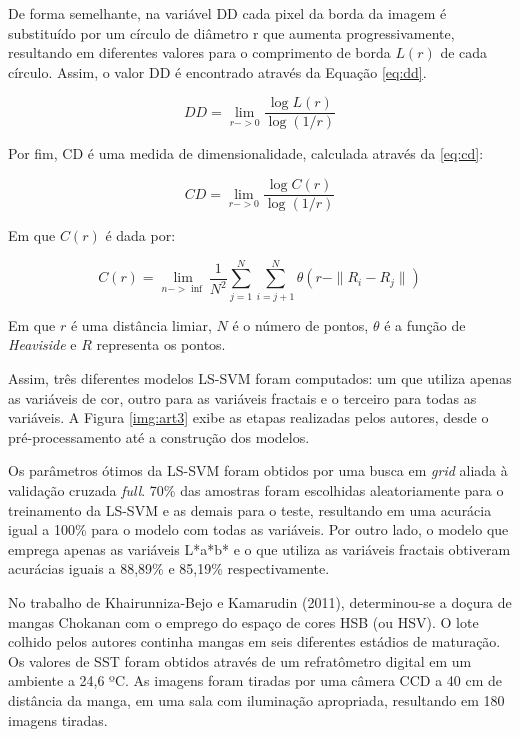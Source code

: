 De forma semelhante, na variável DD cada pixel da borda da imagem é substituído por um círculo de diâmetro r que aumenta progressivamente, resultando em diferentes valores para o comprimento de borda $L(r)$ de cada círculo. Assim, o valor DD é encontrado através da Equação \ref{eq:dd}.

\begin{equation} \label{eq:dd}
	DD = \lim_{r->0}{\frac{\log{L(r)}}{\log{(1/r)}}}
\end{equation}

Por fim, CD é uma medida de dimensionalidade, calculada através da \ref{eq:cd}:

\begin{equation} \label{eq:cd}
	CD = \lim_{r->0}{\frac{\log{C(r)}}{\log{(1/r)}}}
\end{equation}

Em que $C(r)$ é dada por:

\begin{equation} \label{eq:c}
	C(r) = \lim_{n->\inf}\frac{1}{N^2} \sum_{j=1}^N \sum_{i=j+1}^N \theta (r - \|R_i - R_j\|)
\end{equation}

Em que $r$ é uma distância limiar, $N$ é o número de pontos, $\theta$ é a função de \textit{Heaviside} e $R$ representa os pontos.

Assim, três diferentes modelos LS-SVM foram computados: um que utiliza apenas as variáveis de cor, outro para as variáveis fractais e o terceiro para todas as variáveis. A Figura \ref{img:art3} exibe as etapas realizadas pelos autores, desde o pré-processamento até a construção dos modelos.


Os parâmetros ótimos da LS-SVM foram obtidos por uma busca em \textit{grid} aliada à validação cruzada \textit{full}. 70\% das amostras foram escolhidas aleatoriamente para o treinamento da LS-SVM e as demais para o teste, resultando em uma acurácia igual a 100\% para o modelo com todas as variáveis. Por outro lado, o modelo que emprega apenas as variáveis L*a*b* e o que utiliza as variáveis fractais obtiveram acurácias iguais a 88,89\% e 85,19\% respectivamente. 

No trabalho de Khairunniza-Bejo e Kamarudin (2011), determinou-se a doçura de mangas Chokanan com o emprego do espaço de cores HSB (ou HSV). O lote colhido pelos autores continha mangas em seis diferentes estádios de maturação. Os valores de SST foram obtidos através de um refratômetro digital em um ambiente a 24,6 ºC. As imagens foram tiradas por uma câmera CCD a 40 cm de distância da manga, em uma sala com iluminação apropriada, resultando em 180 imagens tiradas.

